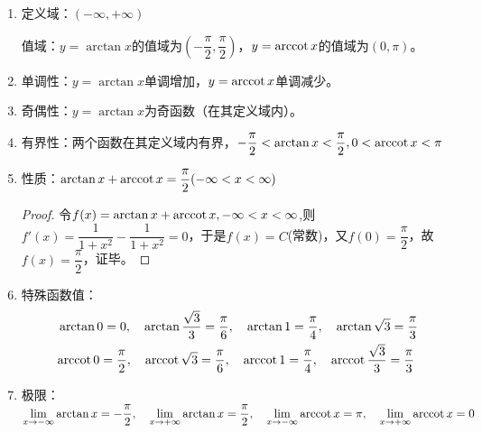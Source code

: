 \begin{note}
    \begin{enumerate}
        \item 定义域：$(-\infty,+\infty)$

        值域：$y=\arctan x$的值域为$\left(-\dfrac{\pi}{2},\dfrac{\pi}{2}\right)$，$y=\mathrm{arccot}\, x$的值域为$(0,\pi)$。

        \item 单调性：$y=\arctan x$单调增加，$y=\mathrm{arccot}\, x$单调减少。

        \item 奇偶性：$y=\arctan x$为奇函数（在其定义域内）。

        \item 有界性：两个函数在其定义域内有界，$-\dfrac{\pi}{2}< \arctan x< \dfrac{\pi}{2}, 0< \mathrm{arccot}\, x<\pi$

        \item 性质：$\arctan x+\mathrm{arccot}\, x = \dfrac{\pi}{2}(-\infty< x <\infty)$
        \begin{proof}
            令$f(x)=\arctan x+\mathrm{arccot}\, x,-\infty< x <\infty$,则$f'(x)=\dfrac{1}{1+x^2}-\dfrac{1}{1+x^2}=0$，于是$f(x)=C$(常数)，又$f(0)=\dfrac{\pi}{2}$，故$f(x)=\dfrac{\pi}{2}$，证毕。
        \end{proof}
        \vspace{2mm}

        \item 特殊函数值：
        \begin{equation}
        \begin{aligned}
            &
            \arctan 0 = 0, \quad \arctan \dfrac{\sqrt{3}}{3} = \dfrac{\pi}{6}, \quad \arctan 1 = \dfrac{\pi}{4}, \quad \arctan \sqrt{3} = \dfrac{\pi}{3} \\
            &
            \mathrm{arccot}\, 0 = \dfrac{\pi}{2}, \quad \mathrm{arccot}\, \sqrt{3} = \dfrac{\pi}{6}, \quad \mathrm{arccot}\, 1 = \dfrac{\pi}{4}, \quad \mathrm{arccot}\, \dfrac{\sqrt{3}}{3} = \dfrac{\pi}{3}
        \end{aligned}    \nonumber
        \end{equation}

        \item 极限：$\displaystyle \lim_{x\rightarrow -\infty} \arctan x = -\dfrac{\pi}{2}, \quad \lim_{x\rightarrow +\infty} \arctan x = \dfrac{\pi}{2}, \quad \lim_{x\rightarrow-\infty} \mathrm{arccot}\, x = \pi, \quad \lim_{x\rightarrow +\infty} \mathrm{arccot}\, x = 0$
    \end{enumerate}
\end{note}

